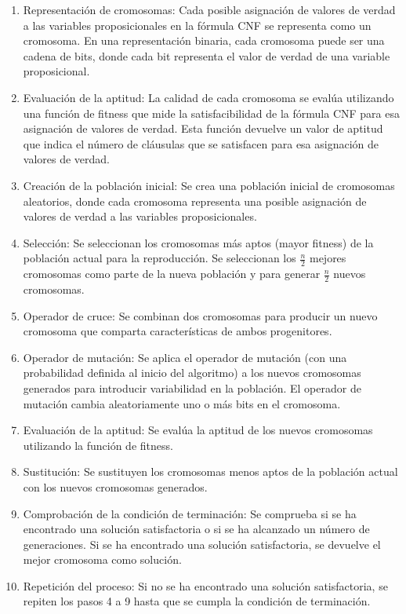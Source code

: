 \documentclass{article}
\begin{document}
        \begin{enumerate}
            \item Representación de cromosomas:  Cada posible asignación de valores de verdad a las 
            variables proposicionales en la fórmula CNF se representa como un cromosoma. 
            En una representación binaria, cada cromosoma puede ser una cadena de bits, donde cada bit 
            representa el valor de verdad de una variable proposicional.
            \item Evaluación de la aptitud: La calidad de cada cromosoma se evalúa utilizando una 
            función de fitness que mide la satisfacibilidad de la fórmula CNF para esa 
            asignación de valores de verdad. Esta función devuelve un valor de aptitud que 
            indica el número de cláusulas que se satisfacen para esa asignación de valores de verdad.
            \item Creación de la población inicial: Se crea una población inicial de cromosomas aleatorios, 
            donde cada cromosoma representa una posible asignación de valores de verdad a 
            las variables proposicionales.
            \item Selección: Se seleccionan los cromosomas más aptos (mayor fitness) de la población actual para la 
            reproducción. Se seleccionan los $\frac{n}{2}$ mejores cromosomas como parte de la nueva población y 
            para generar $\frac{n}{2}$ nuevos cromosomas. 
            \item Operador de cruce: Se combinan dos cromosomas para producir 
            un nuevo cromosoma que comparta características de ambos progenitores.
            \item Operador de mutación: Se aplica el operador de mutación (con una probabilidad definida al inicio del algoritmo) 
            a los nuevos cromosomas 
            generados para introducir variabilidad en la población. El operador de mutación cambia 
            aleatoriamente uno o más bits en el cromosoma.
            \item Evaluación de la aptitud: Se evalúa la aptitud de los nuevos cromosomas utilizando 
            la función de fitness.
            \item Sustitución: Se sustituyen los cromosomas menos aptos de la población actual con 
            los nuevos cromosomas generados.
            \item Comprobación de la condición de terminación: Se comprueba si se ha encontrado una 
            solución satisfactoria o si se ha alcanzado un número de generaciones. 
            Si se ha encontrado una solución satisfactoria, se devuelve el mejor cromosoma como solución.
            \item Repetición del proceso: Si no se ha encontrado una solución satisfactoria, 
            se repiten los pasos 4 a 9 hasta que se cumpla la condición de terminación.
        \end{enumerate}
\end{document}
